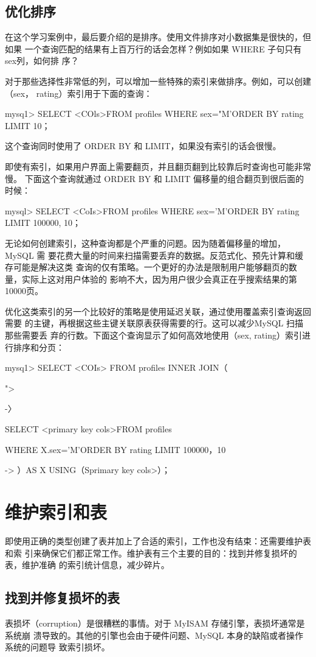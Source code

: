 \subsection{优化排序}
在这个学习案例中，最后要介绍的是排序。使用文件排序对小数据集是很快的，但如果
一个查询匹配的结果有上百万行的话会怎样？例如如果 WHERE 子句只有sex列，如何排
序？

对于那些选择性非常低的列，可以增加一些特殊的索引来做排序。例如，可以创建（sex，
rating）索引用于下面的查询：

mysq1> SELECT <COls>FROM profiles WHERE sex="M'ORDER BY rating LIMIT 10；

这个查询同时使用了 ORDER BY 和 LIMIT，如果没有索引的话会很慢。

即使有索引，如果用户界面上需要翻页，并且翻页翻到比较靠后时查询也可能非常慢。
下面这个查询就通过 ORDER BY 和 LIMIT 偏移量的组合翻页到很后面的时候：

mysql> SELECT <CoIs>FROM profiles WHERE sex='M'ORDER BY rating LIMIT 100000, 10；

无论如何创建索引，这种查询都是个严重的问题。因为随着偏移量的增加，MySQL 需
要花费大量的时间来扫描需要丢弃的数据。反范式化、预先计算和缓存可能是解决这类
查询的仅有策略。一个更好的办法是限制用户能够翻页的数量，实际上这对用户体验的
影响不大，因为用户很少会真正在乎搜索结果的第10000页。

优化这类索引的另一个比较好的策略是使用延迟关联，通过使用覆盖索引查询返回需要
的主键，再根据这些主键关联原表获得需要的行。这可以减少MySQL 扫描那些需要丢
弃的行数。下面这个查询显示了如何高效地使用（sex, rating）索引进行排序和分页：

mysq1> SELECT <COIs> FROM profiles INNER JOIN（

">

-〉

SELECT <primary key cols>FROM profiles

WHERE X.sex='M'ORDER BY rating LIMIT 100000，10

-> ）AS X USING（Sprimary key cols>）；

\section{维护索引和表}
即使用正确的类型创建了表并加上了合适的索引，工作也没有结束：还需要维护表和索
引来确保它们都正常工作。维护表有三个主要的目的：找到并修复损坏的表，维护准确
的索引统计信息，减少碎片。

\subsection{找到并修复损坏的表}
表损坏（corruption）是很糟糕的事情。对于 MyISAM 存储引擎，表损坏通常是系统崩
溃导致的。其他的引擎也会由于硬件问题、MySQL 本身的缺陷或者操作系统的问题导
致索引损坏。

